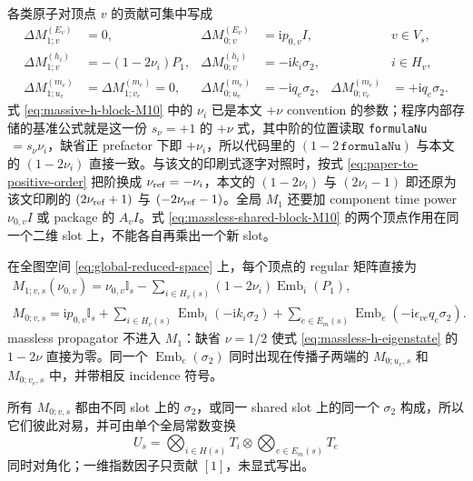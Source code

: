\documentclass[11pt,a4paper]{ctexart}
\newcommand{\ii}{\mathrm i}
\newcommand{\Id}{\mathbb I}
\newcommand{\Emb}{\operatorname{Emb}}
\begin{document}
各类原子对顶点 $v$ 的贡献可集中写成
\begin{align}
 \Delta M_{1;v}^{(E_v)}&=0,
 &\Delta M_{0;v}^{(E_v)}&=\ii p_{0,v} I,
 &&v\in V_s,
 \label{eq:phase-block-M10}\\
 \Delta M_{1;v}^{(h_i)}&=-(1-2\nu_i)P_1,
 &\Delta M_{0;v}^{(h_i)}&=-\ii k_i\sigma_2,
 &&i\in H_v,
 \label{eq:massive-h-block-M10}\\
 \Delta M_{1;u_e}^{(m_e)}&=\Delta M_{1;v_e}^{(m_e)}=0,
 &\Delta M_{0;u_e}^{(m_e)}&=-\ii q_e\sigma_2,
 &\Delta M_{0;v_e}^{(m_e)}&=+\ii q_e\sigma_2.
 \label{eq:massless-shared-block-M10}
\end{align}
式 \eqref{eq:massive-h-block-M10} 中的 $\nu_i$ 已是本文 $+\nu$ convention 的参数；程序内部存储的基准公式就是这一份 $s_\nu=+1$ 的 $+\nu$ 式，其中阶的位置读取 \texttt{formulaNu}$\,=s_\nu\nu_i$，缺省正 prefactor 下即 $+\nu_i$，所以代码里的 $(1-2\,\texttt{formulaNu})$ 与本文的 $(1-2\nu_i)$ 直接一致。与该文的印刷式逐字对照时，按式 \eqref{eq:paper-to-positive-order} 把阶换成 $\nu_{\rm ref}=-\nu_i$，本文的 $(1-2\nu_i)$ 与 $(2\nu_i-1)$ 即还原为该文印刷的 $(2\nu_{\rm ref}+1)$ 与 $(-2\nu_{\rm ref}-1)$。全局 $M_1$ 还要加 component time power $\nu_{0,v}I$ 或 package 的 $A_vI$。式 \eqref{eq:massless-shared-block-M10} 的两个顶点作用在同一个二维 slot 上，不能各自再乘出一个新 slot。

在全图空间 \eqref{eq:global-reduced-space} 上，每个顶点的 regular 矩阵直接为
\begin{align}
 \boxed{
 M_{1;v,s}(\nu_{0,v})
 =\nu_{0,v}\Id_s
 -\sum_{i\in H_v(s)}(1-2\nu_i)\Emb_i(P_1),
 }
 \label{eq:global-M1}\\
 \boxed{
 M_{0;v,s}
 =\ii p_{0,v}\Id_s
 +\sum_{i\in H_v(s)}\Emb_i(-\ii k_i\sigma_2)
 +\sum_{e\in E_m(s)}\Emb_e(-\ii\epsilon_{ve}q_e\sigma_2).
 }
 \label{eq:global-M0}
\end{align}
massless propagator 不进入 $M_1$：缺省 $\nu=1/2$ 使式 \eqref{eq:massless-h-eigenstate} 的 $1-2\nu$ 直接为零。同一个 $\Emb_e(\sigma_2)$ 同时出现在传播子两端的 $M_{0;u_e,s}$ 和 $M_{0;v_e,s}$ 中，并带相反 incidence 符号。

所有 $M_{0;v,s}$ 都由不同 slot 上的 $\sigma_2$，或同一 shared slot 上的同一个 $\sigma_2$ 构成，所以它们彼此对易，并可由单个全局常数变换
\begin{equation}
 U_s
 =\bigotimes_{i\in H(s)}T_i
 \otimes\bigotimes_{e\in E_m(s)}T_e
 \label{eq:global-T}
\end{equation}
同时对角化；一维指数因子只贡献 $[1]$，未显式写出。
\end{document}
